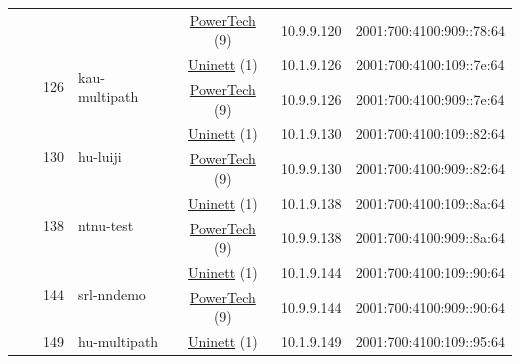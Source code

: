 \begin{small}
\begin{center}
\begin{longtable}{|c|c|c|c|c|c|c|c|}
  &  &  &  & \multicolumn{2}{|c|}{\tiny{\href{http://www.powertech.no}{PowerTech} (9)}} & \tiny{10.9.9.120} & \tiny{2001:700:4100:909::78:64} \\* \cline{3-3}\cline{4-4}\cline{5-5}\cline{6-6}\cline{7-7}\cline{8-8}
  &  & \multirow{2}{*}{\tiny{126}} & \multicolumn{1}{|l|}{\multirow{2}{*}{\tiny{kau-multipath}}} & \multicolumn{2}{|c|}{\tiny{\href{https://www.uninett.no}{Uninett} (1)}} & \tiny{10.1.9.126} & \tiny{2001:700:4100:109::7e:64} \\* \cline{5-5}\cline{6-6}\cline{7-7}\cline{8-8}
  &  &  &  & \multicolumn{2}{|c|}{\tiny{\href{http://www.powertech.no}{PowerTech} (9)}} & \tiny{10.9.9.126} & \tiny{2001:700:4100:909::7e:64} \\* \cline{3-3}\cline{4-4}\cline{5-5}\cline{6-6}\cline{7-7}\cline{8-8}
  &  & \multirow{2}{*}{\tiny{130}} & \multicolumn{1}{|l|}{\multirow{2}{*}{\tiny{hu-luiji}}} & \multicolumn{2}{|c|}{\tiny{\href{https://www.uninett.no}{Uninett} (1)}} & \tiny{10.1.9.130} & \tiny{2001:700:4100:109::82:64} \\* \cline{5-5}\cline{6-6}\cline{7-7}\cline{8-8}
  &  &  &  & \multicolumn{2}{|c|}{\tiny{\href{http://www.powertech.no}{PowerTech} (9)}} & \tiny{10.9.9.130} & \tiny{2001:700:4100:909::82:64} \\* \cline{3-3}\cline{4-4}\cline{5-5}\cline{6-6}\cline{7-7}\cline{8-8}
  &  & \multirow{2}{*}{\tiny{138}} & \multicolumn{1}{|l|}{\multirow{2}{*}{\tiny{ntnu-test}}} & \multicolumn{2}{|c|}{\tiny{\href{https://www.uninett.no}{Uninett} (1)}} & \tiny{10.1.9.138} & \tiny{2001:700:4100:109::8a:64} \\* \cline{5-5}\cline{6-6}\cline{7-7}\cline{8-8}
  &  &  &  & \multicolumn{2}{|c|}{\tiny{\href{http://www.powertech.no}{PowerTech} (9)}} & \tiny{10.9.9.138} & \tiny{2001:700:4100:909::8a:64} \\* \cline{3-3}\cline{4-4}\cline{5-5}\cline{6-6}\cline{7-7}\cline{8-8}
  &  & \multirow{2}{*}{\tiny{144}} & \multicolumn{1}{|l|}{\multirow{2}{*}{\tiny{srl-nndemo}}} & \multicolumn{2}{|c|}{\tiny{\href{https://www.uninett.no}{Uninett} (1)}} & \tiny{10.1.9.144} & \tiny{2001:700:4100:109::90:64} \\* \cline{5-5}\cline{6-6}\cline{7-7}\cline{8-8}
  &  &  &  & \multicolumn{2}{|c|}{\tiny{\href{http://www.powertech.no}{PowerTech} (9)}} & \tiny{10.9.9.144} & \tiny{2001:700:4100:909::90:64} \\* \cline{3-3}\cline{4-4}\cline{5-5}\cline{6-6}\cline{7-7}\cline{8-8}
  &  & \multirow{2}{*}{\tiny{149}} & \multicolumn{1}{|l|}{\multirow{2}{*}{\tiny{hu-multipath}}} & \multicolumn{2}{|c|}{\tiny{\href{https://www.uninett.no}{Uninett} (1)}} & \tiny{10.1.9.149} & \tiny{2001:700:4100:109::95:64} \\* \cline{5-5}\cline{6-6}\cline{7-7}\cline{8-8}

\end{longtable}
\end{center}
\end{small}
